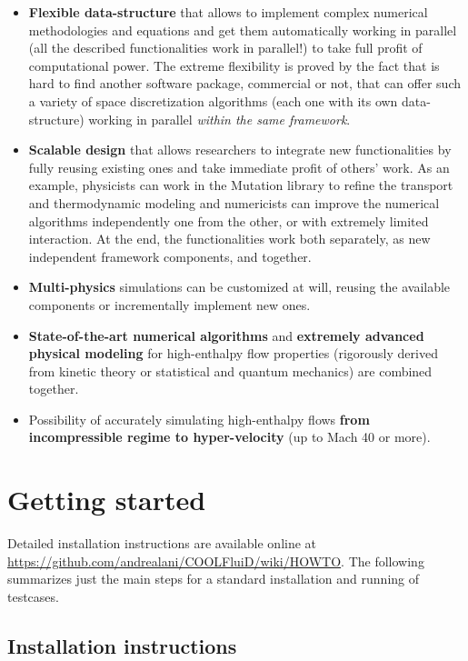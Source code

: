 \documentclass[11pt]{article}
\begin{document}
\begin{itemize}
\item
  {\bf Flexible data-structure} that allows to implement 
  complex numerical methodologies and equations and get them 
  automatically working in parallel (all the described functionalities
  work in parallel!) to take full profit of computational power.
  The extreme flexibility is proved by the fact that is hard to find
  another software package, commercial or not, that can offer such 
  a variety of space discretization algorithms (each one with
  its own data-structure) working in parallel {\it within the same framework}.
\item
  {\bf Scalable design} that allows researchers to integrate new
  functionalities by fully reusing existing ones and take immediate 
  profit of others' work. As an example, physicists can work in 
  the Mutation library to refine the transport and thermodynamic 
  modeling and numericists can improve the numerical algorithms
  independently one from the other, or with extremely limited 
  interaction. At the end, the functionalities work
  both separately, as new independent framework components, and together.
\item
  {\bf Multi-physics} simulations can be customized at will, reusing the
  available components or incrementally implement new ones. 
\item
  {\bf State-of-the-art numerical algorithms} and {\bf extremely advanced
    physical modeling} for high-enthalpy flow properties (rigorously
  derived from kinetic theory or statistical and quantum mechanics)
  are combined together. 
\item
  Possibility of accurately simulating high-enthalpy flows {\bf from
    incompressible regime to hyper-velocity} (up to Mach 40 or more).
\end{itemize}

\section{Getting started}

Detailed installation instructions are available online at \url{https://github.com/andrealani/COOLFluiD/wiki/HOWTO}.
The following summarizes just the main steps for a standard installation and running of testcases.

\subsection{Installation instructions}
\end{document}
